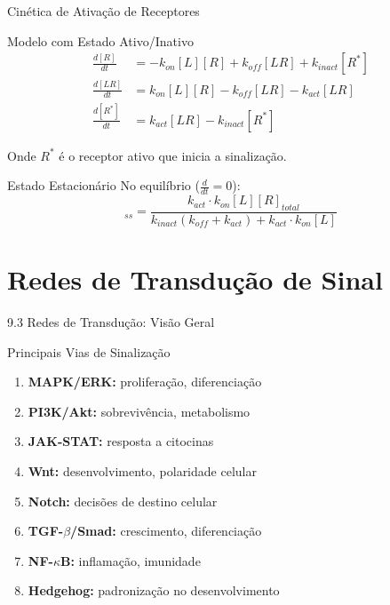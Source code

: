 \begin{frame}{Cinética de Ativação de Receptores}
\begin{block}{Modelo com Estado Ativo/Inativo}
\begin{equation*}
\begin{aligned}
\frac{d[R]}{dt} &= -k_{on}[L][R] + k_{off}[LR] + k_{inact}[R^*]\\
\frac{d[LR]}{dt} &= k_{on}[L][R] - k_{off}[LR] - k_{act}[LR]\\
\frac{d[R^*]}{dt} &= k_{act}[LR] - k_{inact}[R^*]
\end{aligned}
\end{equation*}

Onde $R^*$ é o receptor ativo que inicia a sinalização.
\end{block}

\begin{exampleblock}{Estado Estacionário}
No equilíbrio ($\frac{d}{dt} = 0$):
\begin{equation*}
[R^*]_{ss} = \frac{k_{act} \cdot k_{on}[L][R]_{total}}{k_{inact}(k_{off} + k_{act}) + k_{act} \cdot k_{on}[L]}
\end{equation*}
\end{exampleblock}
\end{frame}

\section{Redes de Transdução de Sinal}

\begin{frame}{9.3 Redes de Transdução: Visão Geral}
\begin{block}{Principais Vias de Sinalização}
\begin{enumerate}
    \item \textbf{MAPK/ERK:} proliferação, diferenciação
    \item \textbf{PI3K/Akt:} sobrevivência, metabolismo
    \item \textbf{JAK-STAT:} resposta a citocinas
    \item \textbf{Wnt:} desenvolvimento, polaridade celular
    \item \textbf{Notch:} decisões de destino celular
    \item \textbf{TGF-$\beta$/Smad:} crescimento, diferenciação
    \item \textbf{NF-$\kappa$B:} inflamação, imunidade
    \item \textbf{Hedgehog:} padronização no desenvolvimento
\end{enumerate}
\end{block}

\end{frame}


